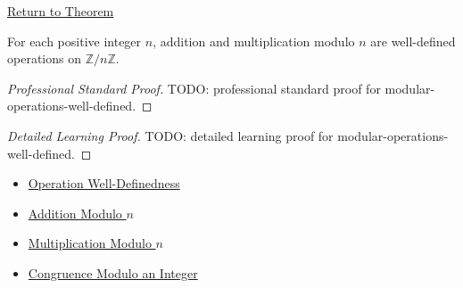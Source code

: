 \newpage
{}
\label{prf:modular-operations-well-defined}

\begin{remark*}[Return]
\hyperref[thm:modular-operations-well-defined]{Return to Theorem}
\end{remark*}

\begin{theorem*}
For each positive integer \(n\), addition and multiplication modulo \(n\) are
well-defined operations on \(\mathbb{Z}/n\mathbb{Z}\).
\end{theorem*}

\begin{proof}[Professional Standard Proof]
\LRAProofBodyStart
TODO: professional standard proof for modular-operations-well-defined.
\end{proof}

\begin{proof}[Detailed Learning Proof]
\LRAProofBodyStart
TODO: detailed learning proof for modular-operations-well-defined.
\end{proof}

\begin{remark*}
\end{remark*}

\begin{dependencies}
\begin{itemize}
  \item \hyperref[def:operation-well-definedness]{Operation Well-Definedness}
  \item \hyperref[def:addition-modulo-n]{Addition Modulo \(n\)}
  \item \hyperref[def:multiplication-modulo-n]{Multiplication Modulo \(n\)}
  \item \hyperref[def:congruence-modulo-integer]{Congruence Modulo an Integer}
\end{itemize}
\end{dependencies}

\clearpage
